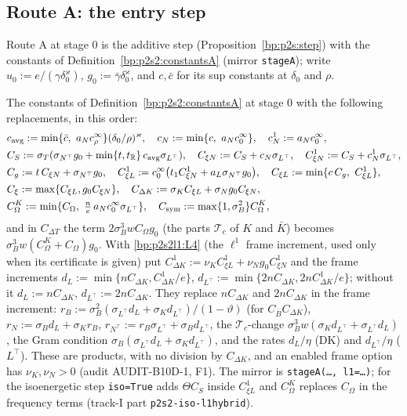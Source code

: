 \subsection{Route A: the entry step}\label{bp:p2s2l1:sec-A}

Route A at stage $0$ is the additive step (Proposition~\ref{bp:p2s:step}) with the constants of Definition~\ref{bp:p2s2:constantsA} (mirror
\texttt{stageA}); write $u_0:=e/(\gamma\delta_0^\varkappa)$, $g_0:=\bar\gamma\delta_0^\varkappa$, and $c,\bar c$ for its sup constants at $\delta_0$ and $\rho$.

\begin{definition}\label{bp:p2s2l1:constA}
The constants of Definition~\ref{bp:p2s2:constantsA} at stage $0$ with the following replacements, in this order:
\begin{align*}
&c_{\mathrm{avg}}:=\min\{\bar c,\ a_Nc^\infty_\rho\}(\delta_0/\rho)^\varkappa,\quad c_N:=\min\{c,\ a_Nc^\infty_0\},\quad c^1_N:=a_Nc^\infty_0,\\
&C_S:=\sigma_T(\sigma_{N^\top}g_0+\min\{t,t_{\R}\}\,c_{\mathrm{avg}}\sigma_{L^\top}),\quad C_{\xi N}:=C_S+c_N\sigma_{L^\top},\quad C^1_{\xi N}:=C_S+c^1_N\sigma_{L^\top},\\
&C_g:=t\,C_{\xi N}+\sigma_{N^\top}g_0,\quad C^1_{\xi L}:=c^\infty_0\bigl(t_1C^1_{\xi N}+a_L\sigma_{N^\top}g_0\bigr),\quad C_{\xi L}:=\min\{c\,C_g,\ C^1_{\xi L}\},\\
&C_\xi:=\max\{C_{\xi L},g_0C_{\xi N}\},\quad C_{\Delta K}:=\sigma_KC_{\xi L}+\sigma_Ng_0C_{\xi N},\\
&C^K_\Omega:=\min\{C_\Omega,\ \tfrac ne\,a_Nc^\infty_0\sigma_{L^\top}\},\quad C_{\mathrm{sym}}:=\max\{1,\sigma_B^2\}C^K_\Omega,
\end{align*}
and in $C_{\Delta T}$ the term $2\sigma_B^3wC_\Omega g_0$ (the parts $\mathcal T_c$ of $K$ and $\bar K$) becomes $\sigma_B^3w(C^K_\Omega+C_\Omega)g_0$. With \ref{bp:p2s2l1:L4}
(the $\ell^1$ frame increment, used only when its certificate is given) put $C^1_{\Delta K}:=\nu_KC^1_{\xi L}+\nu_Ng_0C^1_{\xi N}$ and the frame
increments $d_L:=\min\{nC_{\Delta K},C^1_{\Delta K}/e\}$, $d_{L^\top}:=\min\{2nC_{\Delta K},2nC^1_{\Delta K}/e\}$; without it $d_L:=nC_{\Delta K}$,
$d_{L^\top}:=2nC_{\Delta K}$. They replace $nC_{\Delta K}$ and $2nC_{\Delta K}$ in the frame increment: $r_B:=\sigma_B^2(\sigma_{L^\top}d_L+\sigma_Kd_{L^\top})/(1-\vartheta)$
(for $C_{\bar B}C_{\Delta K}$), $r_N:=\sigma_Bd_L+\sigma_Kr_B$, $r_{N^\top}:=r_B\sigma_{L^\top}+\sigma_Bd_{L^\top}$, the $\mathcal T_c$-change $\sigma_B^3w(\sigma_Kd_{L^\top}+\sigma_{L^\top}d_L)$,
the Gram condition $\sigma_B(\sigma_{L^\top}d_L+\sigma_Kd_{L^\top})$, and the rates $d_L/\eta$ (DK) and $d_{L^\top}/\eta$ ($L^\top$). These are products, with no
division by $C_{\Delta K}$, and an enabled frame option has $\nu_K,\nu_N>0$ (audit AUDIT-B10D-1, F1). The mirror is
\texttt{stageA(\dots, l1=\dots)}; for the isoenergetic step \texttt{iso=True} adds $\Theta C_S$ inside $C^1_{\xi L}$ and $C^K_\Omega$ replaces $C_\Omega$ in
the frequency terms (track-I part \texttt{p2s2-iso-l1hybrid}).
\end{definition}

